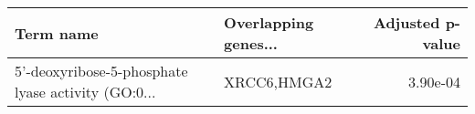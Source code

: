 \begin{tabular}{llr}
\toprule
                                         Term name & Overlapping genes... &  Adjusted p-value \\
\midrule
5'-deoxyribose-5-phosphate lyase activity (GO:0... &          XRCC6,HMGA2 &          3.90e-04 \\
\bottomrule
\end{tabular}

